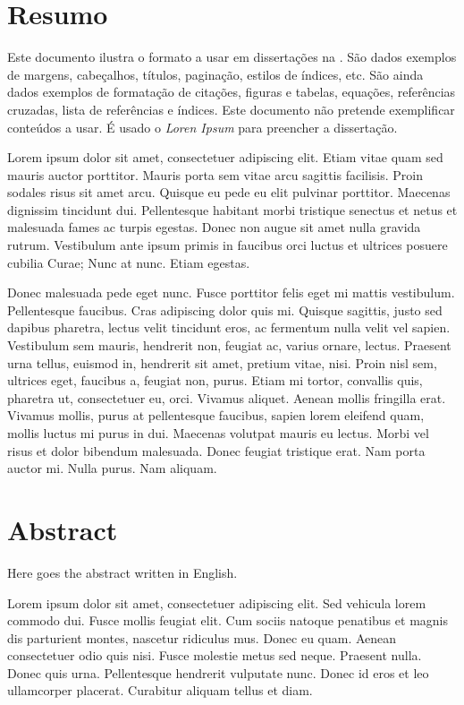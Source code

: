 \chapter*{Resumo}

Este documento ilustra o formato a usar em dissertações na \Feup.
São dados exemplos de margens, cabeçalhos, títulos, paginação, estilos
de índices, etc. 
São ainda dados exemplos de formatação de citações, figuras e tabelas,
equações, referências cruzadas, lista de referências e índices.
Este documento não pretende exemplificar conteúdos a usar. 
É usado o \emph{Loren Ipsum} para preencher a dissertação.

Lorem ipsum dolor sit amet, consectetuer adipiscing elit. Etiam vitae
quam sed mauris auctor porttitor. Mauris porta sem vitae arcu sagittis
facilisis. Proin sodales risus sit amet arcu. Quisque eu pede eu elit
pulvinar porttitor. Maecenas dignissim tincidunt dui. Pellentesque
habitant morbi tristique senectus et netus et malesuada fames ac
turpis egestas. Donec non augue sit amet nulla gravida
rutrum. Vestibulum ante ipsum primis in faucibus orci luctus et
ultrices posuere cubilia Curae; Nunc at nunc. Etiam egestas. 

Donec malesuada pede eget nunc. Fusce porttitor felis eget mi mattis
vestibulum. Pellentesque faucibus. Cras adipiscing dolor quis
mi. Quisque sagittis, justo sed dapibus pharetra, lectus velit
tincidunt eros, ac fermentum nulla velit vel sapien. Vestibulum sem
mauris, hendrerit non, feugiat ac, varius ornare, lectus. Praesent
urna tellus, euismod in, hendrerit sit amet, pretium vitae,
nisi. Proin nisl sem, ultrices eget, faucibus a, feugiat non,
purus. Etiam mi tortor, convallis quis, pharetra ut, consectetuer eu,
orci. Vivamus aliquet. Aenean mollis fringilla erat. Vivamus mollis,
purus at pellentesque faucibus, sapien lorem eleifend quam, mollis
luctus mi purus in dui. Maecenas volutpat mauris eu lectus. Morbi vel
risus et dolor bibendum malesuada. Donec feugiat tristique erat. Nam
porta auctor mi. Nulla purus. Nam aliquam. 


\chapter*{Abstract}

Here goes the abstract written in English.

Lorem ipsum dolor sit amet, consectetuer adipiscing elit. Sed vehicula
lorem commodo dui. Fusce mollis feugiat elit. Cum sociis natoque
penatibus et magnis dis parturient montes, nascetur ridiculus
mus. Donec eu quam. Aenean consectetuer odio quis nisi. Fusce molestie
metus sed neque. Praesent nulla. Donec quis urna. Pellentesque
hendrerit vulputate nunc. Donec id eros et leo ullamcorper
placerat. Curabitur aliquam tellus et diam. 

